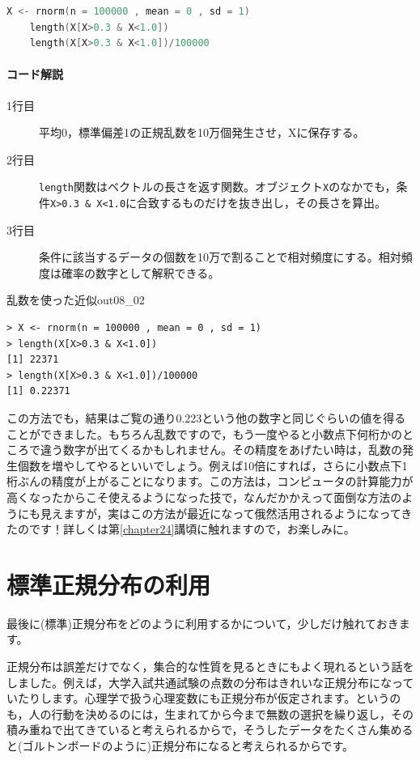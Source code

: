 \documentclass{ltjbook}
\begin{document}
\begin{lstlisting}[language=c++,label={code::08_02},caption={乱数を使った近似}]
    X <- rnorm(n = 100000 , mean = 0 , sd = 1)
    length(X[X>0.3 & X<1.0])
    length(X[X>0.3 & X<1.0])/100000
\end{lstlisting}
\paragraph{コード解説}
\begin{description}
    \item[1行目] 平均0，標準偏差1の正規乱数を10万個発生させ，Xに保存する。
    \item[2行目] \texttt{length}関数はベクトルの長さを返す関数。オブジェクト\texttt{X}のなかでも，条件\verb|X>0.3 & X<1.0|に合致するものだけを抜き出し，その長さを算出。
    \item[3行目] 条件に該当するデータの個数を10万で割ることで相対頻度にする。相対頻度は確率の数字として解釈できる。
\end{description}

\begin{Rscreen}{乱数を使った近似}{out08_02}
\begin{verbatim}
> X <- rnorm(n = 100000 , mean = 0 , sd = 1)
> length(X[X>0.3 & X<1.0])
[1] 22371
> length(X[X>0.3 & X<1.0])/100000
[1] 0.22371
\end{verbatim}
\end{Rscreen}
この方法でも，結果はご覧の通り0.223という他の数字と同じぐらいの値を得ることができました。もちろん乱数ですので，もう一度やると小数点下何桁かのところで違う数字が出てくるかもしれません。その精度をあげたい時は，乱数の発生個数を増やしてやるといいでしょう。例えば10倍にすれば，さらに小数点下1桁ぶんの精度が上がることになります。この方法は，コンピュータの計算能力が高くなったからこそ使えるようになった技で，なんだかかえって面倒な方法のようにも見えますが，実はこの方法が最近になって俄然活用されるようになってきたのです！詳しくは第\ref{chapter24}講頃に触れますので，お楽しみに。

\section{標準正規分布の利用}
\label{UsefulNormal}
最後に(標準)正規分布をどのように利用するかについて，少しだけ触れておきます。

正規分布は誤差だけでなく，集合的な性質を見るときにもよく現れるという話をしました。例えば，大学入試共通試験の点数の分布はきれいな正規分布になっていたりします。心理学で扱う心理変数にも正規分布が仮定されます。というのも，人の行動を決めるのには，生まれてから今まで無数の選択を繰り返し，その積み重ねで出てきていると考えられるからで，そうしたデータをたくさん集めると(ゴルトンボードのように)正規分布になると考えられるからです。
\end{document}
